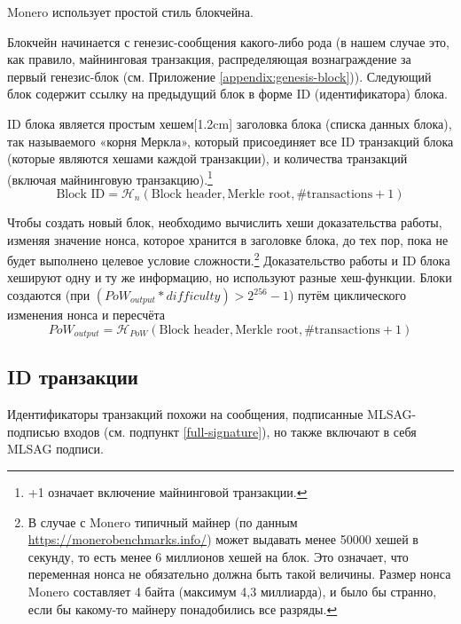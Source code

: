 Monero использует простой стиль блокчейна.

Блокчейн начинается с генезис-сообщения какого-либо рода (в нашем случае это, как правило, майнинговая транзакция, распределяющая вознаграждение за первый генезис-блок (см. При\-ложение \ref{appendix:genesis-block})). Следующий блок содержит ссылку на предыдущий блок в форме ID (идентифи\-катора) блока.

ID блока является простым хешем[1.2cm] заголовка блока (списка данных блока), так называемого «корня Меркла», который присоединяет все ID транзакций блока (которые являются хешами каждой транзакции), и количества транзакций (включая майнинговую транзакцию).\footnote{+1 означает включение майнинговой транзакции.}\vspace{.175cm}
\[\textrm{Block ID} = \mathcal{H}_n(\textrm{Block header}, \textrm{Merkle root}, \# \textrm{transactions} + 1)\]\vspace{.05cm}

Чтобы создать новый блок, необходимо вычислить хеши доказательства работы, изменяя значение нонса, которое хранится в заголовке блока, до тех пор, пока не будет выполнено целевое условие сложности.\footnote{В случае с Monero типичный майнер (по данным \url{https://monerobenchmarks.info/})  может выдавать менее 50000 хешей в секунду, то есть менее 6  миллионов хешей на блок. Это означает, что переменная нонса не обязательно должна быть такой величины. Размер нонса Monero составляет 4 байта (максимум 4,3 миллиарда), и было бы странно, если бы какому-то майнеру понадобились все разряды.} Доказательство работы и ID блока хешируют одну и ту же информацию, но используют разные хеш-функции. Блоки создаются (при \linebreak $({PoW}_{output} * {difficulty}) > 2^{256}-1$) путём циклического изменения нонса и пересчёта\vspace{.175cm}
\[{PoW}_{output} = \mathcal{H}_{PoW}(\textrm{Block header}, \textrm{Merkle root}, \# \textrm{transactions} + 1)\]


\subsection{ID транзакции}
\label{subsec:transaction-id} %
Идентификаторы транзакций похожи на сообщения, подписанные MLSAG-подписью входов (см. подпункт \ref{full-signature}), но также включают в себя MLSAG подписи.

